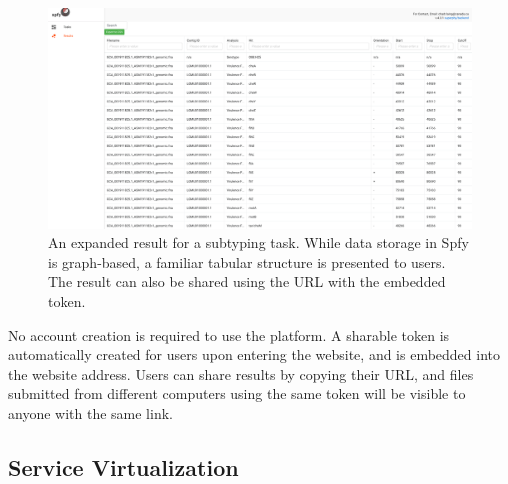 \documentclass{article}
\begin{document}
\begin{figure}[!hb]
\begin{center}
\includegraphics[width=\textwidth]{images/tables.png}
\end{center}
\caption{An expanded result for a subtyping task. While data storage in Spfy is graph-based, a familiar tabular structure is presented to users. The result can also be shared using the URL with the embedded token.}
\label{fig-tables}
\end{figure}

No account creation is required to use the platform. A sharable token is automatically created for users upon entering the website, and is embedded into the website address. Users can share results by copying their URL, and files submitted from different computers using the same token will be visible to anyone with the same link.

\subsection{Service Virtualization}


\end{document}
